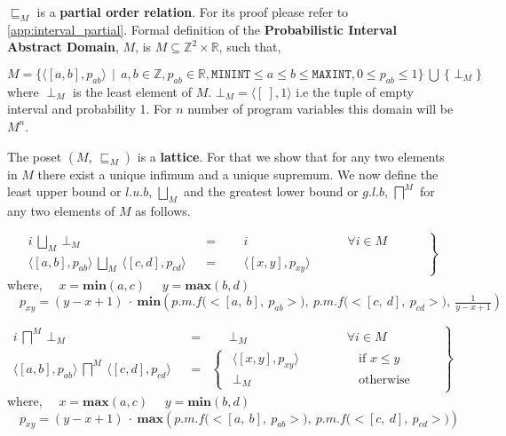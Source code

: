 \documentclass[final,3p, review, times]{util/elsarticle}
\begin{document}
$\sqsubseteq_M$ is a \textbf{partial order relation}. For its proof please refer to \ref{app:interval_partial}. Formal definition of the \textbf{Probabilistic Interval Abstract Domain}, $M$, is $M\subseteq \mathbb{Z}^2\times\mathbb{R}$, such that,

$M=\big\{\langle[a,b],p_{ab}\rangle\ \ |\ \ a,b\in\mathbb{Z}, p_{ab}\in\mathbb{R}, \mathtt{MININT}\leq a\leq b\leq\mathtt{MAXINT}, 0\leq p_{ab}\leq1\big\}\ \bigcup\ \big\{\perp_M\big\}$\\
where $\perp_M$ is the least element of $M$. $\bot_M=\langle[\ ],1\rangle$ i.e the tuple of empty interval and probability 1. For $n$ number of program variables this domain will be $M^n$.

The poset $(M,\ \sqsubseteq_M)$ is a \textbf{lattice}. For that we show that for any two elements in $M$ there exist a unique infimum and a unique supremum. We now define the least upper bound or $l.u.b$, $\displaystyle\bigsqcup_M$ and the greatest lower bound or $g.l.b$, $\displaystyle\bigsqcap^M$ for any two elements of $M$ as follows.

\begin{equation}
\label{eq:lub_M}
 \left.\begin{aligned}
        i\ \bigsqcup_M\ \bot_M&&=&\quad\ \ i\qquad\qquad\qquad\qquad\text{$\forall i\in M$}\\
        \langle[a,b],p_{ab}\rangle\ \bigsqcup_M\ \langle[c,d],p_{cd}\rangle&&=&\quad\ \ \langle[x,y],p_{xy}\rangle\qquad\quad\qquad\qquad
       \end{aligned}\qquad
 \right\}
\end{equation}
where,
	$\quad x=\mathbf{min}(a,c)$
	$\quad y=\mathbf{max}(b,d)$
	$\quad\displaystyle p_{xy}=(y-x+1)\ \cdot\ \mathbf{min}\left(p.m.f\Big(\big<[a,\ b],\ p_{ab}\big>\Big),\ p.m.f\Big(\big<[c,\ d],\ p_{cd}\big>\Big),\ \frac{1}{y-x+1}\right)$
	
\begin{equation}
\label{eq:glb_M}
 \left.\begin{aligned}
        i\ \bigsqcap^M\ \bot_M&&=&\quad\ \ \bot_M\qquad\qquad\qquad\qquad\text{$\forall i\in M$}&\\
        \langle[a,b],p_{ab}\rangle\ \bigsqcap^M\ \langle[c,d],p_{cd}\rangle&&=&\begin{cases} 
   			  \ \ \langle[x,y],p_{xy}\rangle&\qquad\qquad\text{if }x\leq y\\
   			  \ \ \bot_M&\qquad\qquad\text{otherwise}
  			\end{cases}
       \end{aligned}\quad
 \right\}
\end{equation}
where,
	$\quad x=\mathbf{max}(a,c)$
	$\quad y=\mathbf{min}(b,d)$
	$\quad\displaystyle p_{xy}=(y-x+1)\ \cdot\ \mathbf{max}\left(p.m.f\Big(\big<[a,\ b],\ p_{ab}\big>\Big),\ p.m.f\Big(\big<[c,\ d],\ p_{cd}\big>\Big)\right)$
\end{document}
